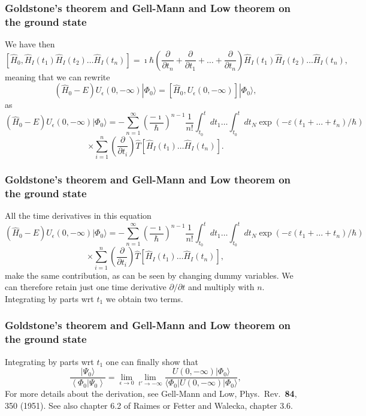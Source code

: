 \documentclass[compress]{beamer}
\newcommand*{\ket}[1]{|#1\rangle}
\newcommand*{\bra}[1]{\langle#1|}
\begin{document}
{
\frametitle{Goldstone's theorem and Gell-Mann and Low theorem on the ground state}
\begin{small}
{\scriptsize
We have then
\[
\left[\hat{H}_0,\hat{H}_I(t_1)\hat{H}_I(t_2)\dots \hat{H}_I(t_n)\right]=\imath \hbar\left(\frac{\partial }{\partial t_n}+\frac{\partial }{\partial t_1}+\dots+\frac{\partial }{\partial t_n}\right) \hat{H}_I(t_1)\hat{H}_I(t_2)\dots\hat{H}_I(t_n),
\]
meaning that we can rewrite
\[
(\hat{H}_0-E)U_{\epsilon }(0,-\infty )\ket{\Phi_0}=\left[\hat{H}_0,U_{\epsilon }(0,-\infty )\right]\ket{\Phi_0},
\]
as
\[
(\hat{H}_0-E)U_{\epsilon }(0,-\infty )\ket{\Phi_0}=-\sum_{n=1}^{\infty}\left(\frac{-\imath}{\hbar}\right)^{n-1}\frac{1}{n!}
\int_{t_0}^t dt_1\dots \int_{t_0}^t dt_N \exp{(-\varepsilon(t_1+\dots+t_n)/\hbar)}
\]
\[
\times\sum_{i=1}^n(\frac{\partial }{\partial t_i} )\hat{T}\left[\hat{H}_I(t_1)\dots\hat{H}_I(t_n)\right].
\]
}
\end{small}
}
\frame
{
\frametitle{Goldstone's theorem and Gell-Mann and Low theorem on the ground state}
\begin{small}
{\scriptsize
All the time derivatives in this equation 
\[
(\hat{H}_0-E)U_{\epsilon }(0,-\infty )\ket{\Phi_0}=-\sum_{n=1}^{\infty}\left(\frac{-\imath}{\hbar}\right)^{n-1}\frac{1}{n!}
\int_{t_0}^t dt_1\dots \int_{t_0}^t dt_N \exp{(-\varepsilon(t_1+\dots+t_n)/\hbar)}
\]
\[
\times\sum_{i=1}^n(\frac{\partial }{\partial t_i} )\hat{T}\left[\hat{H}_I(t_1)\dots\hat{H}_I(t_n)\right],
\]
make the same contribution, as can be seen by changing dummy variables. We can therefore retain just one time derivative $\partial/\partial t$ and multiply with $n$. Integrating by parts wrt $t_1$  we obtain two terms. 
}
\end{small}
}
\frame
{
\frametitle{Goldstone's theorem and Gell-Mann and Low theorem on the ground state}
\begin{small}
{\scriptsize
Integrating by parts wrt $t_1$  one can finally show that
\[
        \frac{\ket{\Psi_0}}{\left\langle\Phi_0 | \Psi_0 \right\rangle}=
    \lim_{\epsilon \rightarrow 0}
   \lim_{t'\rightarrow -\infty}
   \frac{U(0,-\infty )\ket{\Phi_0} }
   { \bra{\Phi_0} U(0,-\infty )\ket{\Phi_0} },
\]
For more details about the derivation, see Gell-Mann and Low, Phys.~Rev.~{\bf 84}, 350  (1951). See also chapter 6.2 of Raimes or Fetter and Walecka, chapter 3.6.
}
\end{small}
}
\frame
\end{document}
